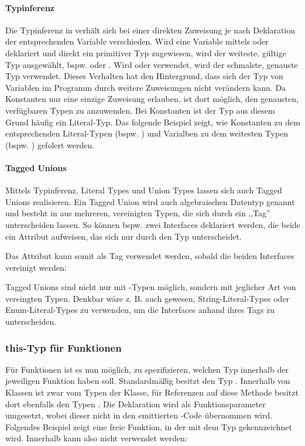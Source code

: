 \paragraph*{Typinferenz}
Die Typinferenz in  verhält sich bei einer direkten Zuweisung je nach Deklaration der entsprechenden Variable verschieden. Wird eine Variable mittels \tsvar oder \tslet deklariert und direkt ein primitiver Typ zugewiesen, wird der weiteste, gültige Typ ausgewählt, bspw. \tsstring oder \tsnumber. Wird \tsconst oder \tsreadonly verwendet, wird der schmalste, genauste Typ verwendet. Dieses Verhalten hat den Hintergrund, dass sich der Typ von Variablen im Programm durch weitere Zuweisungen nicht verändern kann. Da Konstanten nur eine einzige Zuweisung erlauben, ist dort möglich, den genausten, verfügbaren Typen zu anzuwenden. Bei Konstanten ist der Typ aus diesem Grund häufig ein Literal-Typ. Das folgende Beispiel zeigt, wie Konstanten zu dem entsprechenden Literal-Typen (bspw. ) und Varialben zu dem weitesten Typen (bspw. \tsstring) gefolert werden.


\paragraph*{Tagged Unions}
Mittels Typinferenz, Literal Types und Union Types lassen sich auch Tagged Unions realisieren. Ein Tagged Union wird auch algebraischen Datentyp genannt und besteht in \ts aus mehreren, vereinigten Typen, die sich durch ein ,,Tag'' unterscheiden lassen. So können bspw. zwei Interfaces deklariert werden, die beide ein Attribut aufweisen, das sich nur durch den Typ unterscheidet.


Das Attribut  kann somit als Tag verwendet werden, sobald die beiden Interfaces vereinigt werden:


Tagged Unions sind nicht nur mit -Typen möglich, sondern mit jeglicher Art von vereingten Typen. Denkbar wäre z. B. auch gewesen, String-Literal-Types oder Enum-Literal-Types zu verwenden, um die Interfaces anhand ihres Tags zu unterscheiden.

\subsubsection{this-Typ für Funktionen}
Für Funktionen ist es nun möglich, zu spezifizieren, welchen Typ \tsthis innerhalb der jeweiligen Funktion haben soll. Standardmäßig besitzt \tsthis den Typ \tsany. Innerhalb von Klassen ist \tsthis zwar vom Typen der Klasse, für Referenzen auf diese Methode besitzt dort \tsthis ebenfalls den Typen \tsany.
Die Deklaration wird als Funktionsparameter umgesetzt, wobei dieser nicht in den emittierten \js-Code übernommen wird. Folgendes Beispiel zeigt eine freie Funktion, in der \tsthis mit dem Typ \tsvoid gekennzeichnet wird. Innerhalb kann \tsthis also nicht verwendet werden:

